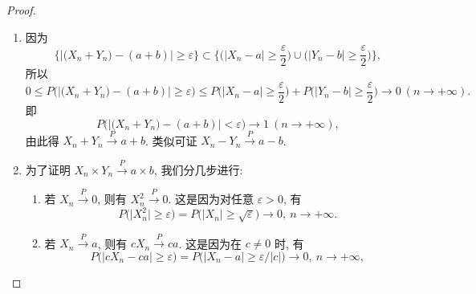 \begin{proof}
    \begin{enumerate}
        \item\label{thm:4.3.1.1} 因为
        \begin{equation*}
            \bigl\{ \bigl\lvert \bigl( X_n + Y_n \bigr) - ( a + b ) \bigr\rvert \geq \varepsilon \bigr\} \subset \biggl\{ \biggl( \bigl\lvert X_n - a \bigr\rvert \geq \frac{\varepsilon}{2} \biggr) \cup \biggl( \bigl\lvert Y_n - b \bigr\rvert \geq \frac{\varepsilon}{2} \biggr) \biggr\},
        \end{equation*}
        所以
        \begin{equation*}
            0 \leq P \bigl( \big\lvert \bigl( X_n + Y_n \bigr) - ( a + b ) \bigr\rvert \geq \varepsilon \bigr)
            \leq P \biggl( \bigl\lvert X_n - a \bigr\rvert \geq \frac{\varepsilon}{2} \biggr) + P \biggl( \bigl\lvert Y_n - b \bigr\rvert \geq \frac{\varepsilon}{2} \biggr) \to 0 \ ( n \to +\infty ).
        \end{equation*}
        即
        \begin{equation*}
            P \bigl( \bigl\lvert \bigl( X_n + Y_n ) - ( a + b ) \bigr\rvert < \varepsilon \bigr) \to 1 \ ( n \to +\infty ),
        \end{equation*}
        由此得 $ X_n + Y_n \stackrel{P}{\to} a + b $.
        类似可证 $ X_n - Y_n \stackrel{P}{\to} a - b $.
        \item\label{thm:4.3.1.2} 为了证明 $ X_n \times Y_n \stackrel{P}{\to} a \times b $, 我们分几步进行:
        \begin{enumerate}
            \item 若 $ X_n \stackrel{P}{\to} 0 $, 则有 $ X_n^2 \stackrel{P}{\to} 0 $.
            这是因为对任意 $ \varepsilon > 0 $, 有
            \begin{equation*}
                P \bigl( \bigl\lvert X_n^2 \bigr\rvert \geq \varepsilon \bigr) = P \bigl( \bigl\lvert X_n \bigr\rvert \geq \sqrt{\varepsilon} \bigr) \to 0, \ n \to + \infty.
            \end{equation*}
            \item 若 $ X_n \stackrel{P}{\to} a $, 则有 $ cX_n \stackrel{P}{\to} ca $. 这是因为在 $ c \neq 0 $ 时, 有
            \begin{equation*}
                P \bigl( \bigl\lvert c X_n - ca \bigr\rvert \geq \varepsilon \bigr) = P \bigl( \bigl\lvert X_n - a \bigr\rvert \geq \varepsilon/\lvert c \rvert \bigr) \to 0, \ n \to +\infty,
            \end{equation*}

\end{enumerate}
\end{enumerate}
\end{proof}
